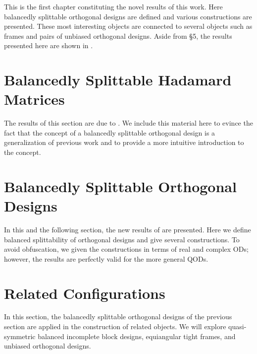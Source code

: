 \documentclass[../../main]{subfiles}
\begin{document}
This is the first chapter constituting the novel results of this work. Here
balancedly splittable orthogonal designs are defined and various constructions
are presented. These most interesting objects are connected to several objects
such as frames and pairs of unbiased orthogonal designs. Aside from \S 5, the
results presented here are shown in \cite{split-od}.

\fancyhf{}

\fancyhead[RO,LE]{\thepage}

 \section{\centering Balancedly Splittable Hadamard Matrices}
 The results of this section are due to \cite{splittable-hadamard}. We include
 this material here to evince the fact that the concept of a balancedly
 splittable orthogonal design is a generalization of previous work and to
 provide a more intuitive introduction to the concept. 
 
 \dinkus
 
 
 
 \fancyhf{}

 \fancyhead[RO,LE]{\thepage}
 
 \section{\centering Balancedly Splittable Orthogonal Designs}
 In this and the following section, the new results of \cite{split-od} are presented. Here we define balanced splittability of orthogonal designs and give several constructions. To avoid obfuscation, we given the constructions in terms of real and complex ODs; however, the results are perfectly valid for the more general QODs.
 
 \dinkus
 
 
 
 \fancyhf{}

 \fancyhead[RO,LE]{\thepage}

 \section{\centering Related Configurations}
 In this section, the balancedly splittable orthogonal designs of the previous section are applied in the construction of related objects. We will explore quasi-symmetric balanced incomplete block designs, equiangular tight frames, and unbiased orthogonal designs.
 
\end{document}
